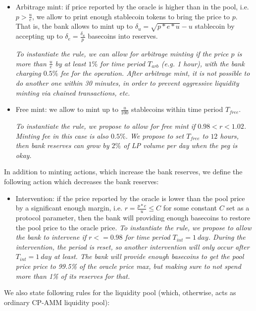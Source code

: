 \documentclass[a4paper,UKenglish,cleveref, autoref, thm-restate]{lipics-v2021}
\newcommand{\sct}{stablecoin}
\begin{document}
\begin{itemize}
  \item {Arbitrage mint:} if price reported by the oracle is higher than in the pool, i.e. $p > \frac{u}{e}$, we allow to print enough \sct{} tokens to bring the price to $p$. That is, the bank allows to mint up to $\delta_u = \sqrt{p*e*u}-u$ \sct{} by accepting up to $\delta_e = \frac{\delta_u}{p}$ basecoins into reserves. 
  
    \emph{To instantiate the rule, we can allow for arbitrage minting if the price $p$ is more than $\frac{u}{e}$ by at least $1\%$ for time period $T_{arb}$ (e.g. 1 hour), with the bank charging $0.5\%$ fee for the operation. After arbitrage mint, it is not possible to do another one within 30 minutes, in order to prevent aggressive liquidity minting via chained transactions, etc.}

  \item {Free mint:} we allow to mint up to $\frac{u}{100}$ \sct{}s within time period $T_{free}$. 
  
    \emph{To instantiate the rule, we propose to allow for free mint if $0.98 < r < 1.02$. Minting fee in this case is also $0.5\%$. We propose to set $T_{free}$ to $12$ hours, then bank reserves can grow by $2\%$ of LP volume per day when the peg is okay.}
\end{itemize}

In addition to minting actions, which increase the bank reserves, we define the following action which decreases the bank reserves: 

\begin{itemize}
   \item{Intervention:} if the price reported by the oracle is lower than the pool price by a significant enough margin, i.e. $r = \frac{p*e}{u} \le C$ for some constant $C$ set as a protocol parameter, then the bank will providing enough basecoins to restore the pool price to the oracle price.
   \emph{To instantiate the rule, we propose to allow the bank to intervene if $r <= 0.98$ for time period $T_{int} = 1 {\ day}$.
       During the intervention, the period is reset, so another intervention will only occur after $T_{int} = 1 {\ day}$ at least. The bank will provide enough basecoins to get the pool price
       price to 99.5\% of the oracle price max, but making sure to not spend more than 1\% of its reserves for that.}
\end{itemize}

We also state following rules for the liquidity pool (which, otherwise, acts as ordinary CP-AMM liquidity pool): 
\end{document}
